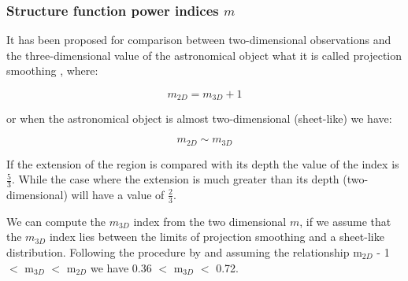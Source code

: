 \documentclass[fleqn,usenatbib, useAMS, a4paper]{mnras}
\begin{document}

\subsubsection{Structure function power indices \(m\)}


It has been proposed for comparison between two-dimensional observations and the three-dimensional value of the astronomical object what it is called projection smoothing \citep{von1951methode, munch1958internal,1987ApJ...317..686O}, where:

\begin{equation}\label{eq:exp1}
m_{2D}= m_{3D} + 1
\end{equation}

or when the astronomical object is almost two-dimensional (sheet-like) we have:

\begin{equation}\label{eq:exp2}
m_{2D} \sim m_{3D}
\end{equation}

If the extension of the region is compared with its depth the value of the index is $\frac{5}{3}$. While the case where the extension is much greater than its depth (two-dimensional) will have a value of $\frac{2}{3}$.

We can compute the $m_{3D}$ index from the two dimensional \(m\), if we assume that the $m_{3D}$ index lies between the limits of projection smoothing and a sheet-like distribution. 
Following the procedure by \cite{arthur2016turbulence} and assuming the relationship m$_{2D}$ - 1 $<$ m$_{3D}$ $<$ m$_{2D}$ we have 0.36 $<$ m$_{3D}$ $<$ 0.72.
\end{document}
